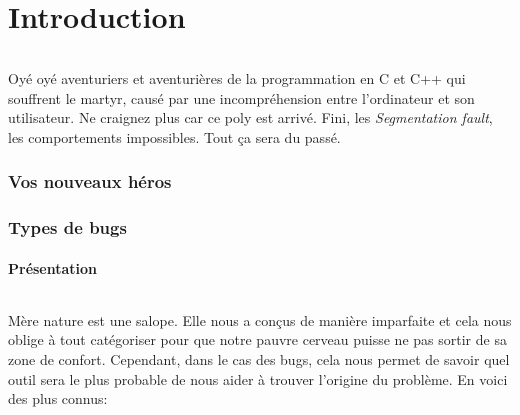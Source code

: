 \part{Introduction}

\paragraph{}

Oyé oyé aventuriers et aventurières de la programmation en C et C++ qui
souffrent le martyr, causé par une incompréhension entre l'ordinateur et son
utilisateur. Ne craignez plus car ce poly est arrivé. Fini, les
\textit{Segmentation fault}, les comportements impossibles. Tout ça sera du
passé.

\section{Vos nouveaux héros}


\section{Types de bugs}

\subsection{Présentation}

\paragraph{}

Mère nature est une salope. Elle nous a conçus de manière imparfaite et cela
nous oblige à tout catégoriser pour que notre pauvre cerveau puisse ne pas
sortir de sa zone de confort. Cependant, dans le cas des bugs, cela nous permet
de savoir quel outil sera le plus probable de nous aider à trouver l'origine du
problème. En voici des plus connus:


